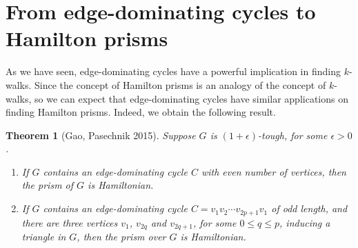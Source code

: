 \documentclass[12pt]{report}
\newtheorem{theorem}{Theorem}
\begin{document}
\section{From edge-dominating cycles to Hamilton prisms}
As we have seen, edge-dominating cycles have a powerful implication in finding $k$-walks. Since the concept of Hamilton prisms is an analogy of the concept of $k$-walks, so we can expect that edge-dominating cycles have similar applications on finding Hamilton prisms. Indeed, we obtain the following result.
\begin{theorem}[Gao, Pasechnik 2015]\label{edhctohprthlm}
Suppose $G$ is $(1+\epsilon)$-tough, for some $\epsilon>0$.
\begin{enumerate}
\item If $G$ contains an edge-dominating cycle $C$ with even number of vertices, then the prism of $G$ is Hamiltonian.
\item If $G$ contains an edge-dominating cycle $C=v_1v_2\cdots v_{2p+1}v_1$ of odd length, and there are three vertices $v_1$, $v_{2q}$ and $v_{2q+1}$, for some $0\le q\le p$, inducing a triangle in $G$, then the prism over $G$ is Hamiltonian.
\end{enumerate}
\end{theorem}
\end{document}
